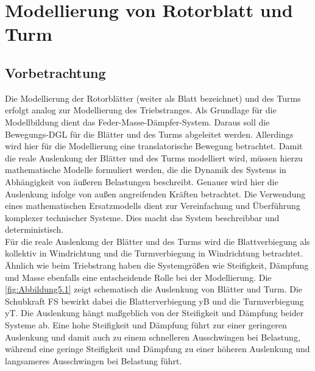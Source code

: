 \section{Modellierung von Rotorblatt und Turm} \label{turm_blatt}

\subsection{Vorbetrachtung}
Die Modellierung der Rotorblätter (weiter als Blatt bezeichnet) und des Turms erfolgt analog zur Modellierung des Triebstranges. Als Grundlage für die Modellbildung dient das Feder-Masse-Dämpfer-System. Daraus soll die Bewegungs-DGL für die Blätter und des Turms abgeleitet werden. Allerdings wird hier für die Modellierung eine translatorische Bewegung betrachtet. Damit die reale Auslenkung der Blätter und des Turms modelliert wird, müssen hierzu mathematische Modelle formuliert werden, die die Dynamik des Systems in Abhängigkeit von äußeren Belastungen beschreibt. Genauer wird hier die Auslenkung infolge von außen angreifenden Kräften betrachtet. Die Verwendung eines mathematischen Ersatzmodells dient zur Vereinfachung und Überführung komplexer technischer Systeme. Dies macht das System beschreibbar und deterministisch. 
\\
Für die reale Auslenkung der Blätter und des Turms wird die Blattverbiegung als kollektiv in Windrichtung und die Turmverbiegung in Windrichtung betrachtet. Ähnlich wie beim Triebstrang haben die Systemgrößen wie Steifigkeit, Dämpfung und Masse ebenfalls eine entscheidende Rolle bei der Modellierung. Die \autoref{fig:Abbildung5.1} zeigt schematisch die Auslenkung von Blätter und Turm. Die Schubkraft \acs{FS} bewirkt dabei die Blatterverbiegung \acs{yB} und die Turmverbiegung \acs{yT}. Die Auslenkung hängt maßgeblich von der Steifigkeit und Dämpfung beider Systeme ab. Eine hohe Steifigkeit und Dämpfung führt zur einer geringeren Auslenkung und damit auch zu einem schnelleren Ausschwingen bei Belastung, während eine geringe Steifigkeit und Dämpfung zu einer höheren Auslenkung und langsameres Ausschwingen bei Belastung führt.
